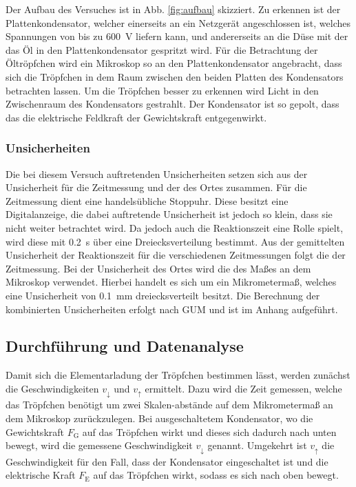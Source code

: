 Der Aufbau des Versuches ist in Abb. \ref{fig:aufbau} skizziert. 
Zu erkennen ist der Plattenkondensator, welcher einerseits an ein Netzgerät angeschlossen ist, welches Spannungen von bis zu \SI{600}{\volt} liefern kann, und andererseits an die Düse mit der das Öl in den Plattenkondensator gespritzt wird.
Für die Betrachtung der Öltröpfchen wird ein Mikroskop so an den Plattenkondensator angebracht, dass sich die Tröpfchen in dem Raum zwischen den beiden Platten des Kondensators betrachten lassen. 
Um die Tröpfchen besser zu erkennen wird Licht in den Zwischenraum des Kondensators gestrahlt.
Der Kondensator ist so gepolt, dass das die elektrische Feldkraft der Gewichtskraft entgegenwirkt.

\subsubsection{Unsicherheiten} %

Die bei diesem Versuch auftretenden Unsicherheiten setzen sich aus der Unsicherheit für die Zeitmessung und der des Ortes zusammen.
Für die Zeitmessung dient eine handelsübliche Stoppuhr.
Diese besitzt eine Digitalanzeige, die dabei auftretende Unsicherheit ist jedoch so klein, dass sie nicht weiter betrachtet wird.
Da jedoch auch die Reaktionszeit eine Rolle spielt, wird diese mit \SI{0,2}{\second} über eine Dreiecksverteilung bestimmt.
Aus der gemittelten Unsicherheit der Reaktionszeit für die verschiedenen Zeitmessungen folgt die der Zeitmessung.
Bei der Unsicherheit des Ortes wird die des Maßes an dem Mikroskop verwendet.
Hierbei handelt es sich um ein Mikrometermaß, welches eine Unsicherheit von \SI{0,1}{\milli\meter} dreiecksverteilt besitzt.
Die Berechnung der kombinierten Unsicherheiten erfolgt nach GUM und ist im Anhang aufgeführt.

\subsection{Durchführung und Datenanalyse}

Damit sich die Elementarladung der Tröpfchen bestimmen lässt, werden zunächst die Geschwindigkeiten $v_{\downarrow}$ und $v_{\uparrow}$ ermittelt.
Dazu wird die Zeit gemessen, welche das Tröpfchen benötigt um zwei Skalen-abstände auf dem Mikrometermaß an dem Mikroskop zurückzulegen.
Bei ausgeschaltetem Kondensator, wo die Gewichtskraft $F_\text{G}$ auf das Tröpfchen wirkt und dieses sich dadurch nach unten bewegt, wird die gemessene Geschwindigkeit $v_{\downarrow}$ genannt.
Umgekehrt ist $v_{\uparrow}$ die Geschwindigkeit für den Fall, dass der Kondensator eingeschaltet ist und die elektrische Kraft $F_\text{E}$ auf das Tröpfchen wirkt, sodass es sich nach oben bewegt. 

